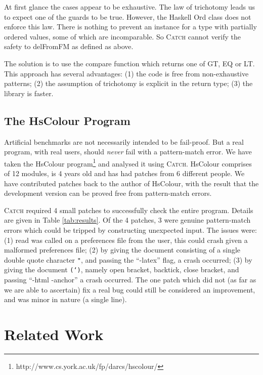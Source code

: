 \documentclass[preprint]{sigplanconf}
\newcommand{\T}[1]{\texttt{#1}}
\newcommand{\C}[1]{\textsf{#1}}
\newcommand{\catch}{\textsc{Catch}}
\newcommand{\newtool}{\anon{\catch07}{\catch}}
\newcommand{\anon}[2]{#2}
\begin{document}
At first glance the cases appear to be exhaustive. The law of trichotomy leads us to expect one of the guards to be true. However, the Haskell \C{Ord} class does not enforce this law. There is nothing to prevent an instance for a type with partially ordered values, some of which are incomparable. So \catch{} cannot verify the safety to \C{delFromFM} as defined as above.

The solution is to use the \C{compare} function which returns one of \C{GT}, \C{EQ} or \C{LT}. This approach has several advantages: (1) the code is free from non-exhaustive patterns; (2) the assumption of trichotomy is explicit in the return type; (3) the library is faster.


\subsection{The HsColour Program}
\label{sec:hscolour}

Artificial benchmarks are not necessarily intended to be fail-proof. But a real program, with real users, should \textit{never} fail with a pattern-match error. We have taken the HsColour program\footnote{http://www.cs.york.ac.uk/fp/darcs/hscolour/} and analysed it using \newtool{}. HsColour comprises of 12 modules, is 4 years old and has had patches from 6 different people.
We have contributed patches back to the author of HsColour, with the result that the development version can be proved free from pattern-match errors.

\catch{} required 4 small patches to successfully check the entire program. Details are given in Table \ref{tab:results}. Of the 4 patches, 3 were genuine pattern-match errors which could be tripped by constructing unexpected input. The issues were: (1) \C{read} was called on a preferences file from the user, this could crash given a malformed preferences file; (2) by giving the document consisting of a single double quote character \T{"}, and passing the ``-latex'' flag, a crash occurred; (3) by giving the document \T{(`)}, namely open bracket, backtick, close bracket, and passing ``-html -anchor'' a crash occurred. The one patch which did not (as far as we are able to ascertain) fix a real bug could still be considered an improvement, and was minor in nature (a single line).


\section{Related Work}
\label{sec:related}
\end{document}
